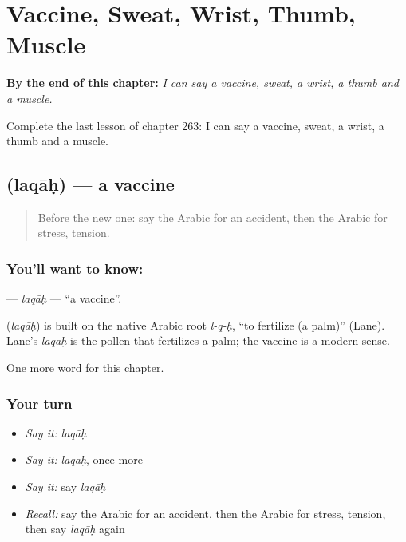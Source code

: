 
\chapter{Vaccine, Sweat, Wrist, Thumb, Muscle}
\label{ch:ar-vaccine-sweat-wrist-thumb-muscle}

\begin{chapteropening}
\textbf{By the end of this chapter:} \emph{I can say a vaccine, sweat, a wrist, a thumb and a muscle.}

Complete the last lesson of chapter 263: I can say a vaccine, sweat, a wrist, a thumb and a muscle.
\end{chapteropening}

\section[\texorpdfstring{\ar{لقاح} (laqāḥ)}{لقاح (laqāḥ)}]{ (laqāḥ) — a vaccine}

\label{lesson:AR-C263-laqah}



\begin{quote}
Before the new one: say the Arabic for an accident, then the Arabic for stress, tension.
\end{quote}

\subsection*{You'll want to know: }
\textbf{} — \emph{laqāḥ} — \textquotedblleft{}a vaccine\textquotedblright{}.

\begin{cousinweb}
\textbf{} (\emph{laqāḥ}) is built on the native Arabic root \emph{l-q-ḥ}, \textquotedblleft{}to fertilize (a palm)\textquotedblright{} (Lane). Lane's \emph{laqāḥ} is the pollen that fertilizes a palm; the vaccine is a modern sense.
\end{cousinweb}

\begin{grammarlens}[title={What you've built}]
One more word for this chapter.
\end{grammarlens}

\subsection*{Your turn}
\begin{itemize}
\raggedright
  \item \emph{Say it:} \emph{laqāḥ}
  \item \emph{Say it:} \emph{laqāḥ}, once more
  \item \emph{Say it:} say \emph{laqāḥ}
  \item \emph{Recall:} say the Arabic for an accident, then the Arabic for stress, tension, then say \emph{laqāḥ} again
\end{itemize}

